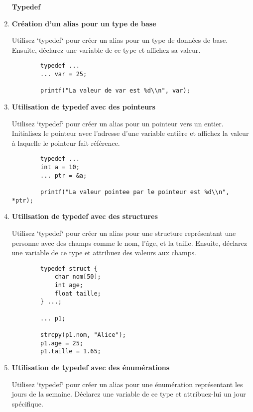 \begin{enumerate}
\textbf{Typedef}

	 \item \textbf{Création d'un alias pour un type de base}
	
	Utilisez `typedef` pour créer un alias pour un type de données de base. Ensuite, déclarez une variable de ce type et affichez sa valeur.
	
	\begin{lstlisting}
		typedef ...
		... var = 25;
		
		printf("La valeur de var est %d\\n", var);
	\end{lstlisting}
	
	\item \textbf{Utilisation de typedef avec des pointeurs}
	
	Utilisez `typedef` pour créer un alias pour un pointeur vers un entier. Initialisez le pointeur avec l'adresse d'une variable entière et affichez la valeur à laquelle le pointeur fait référence.
	
	\begin{lstlisting}
		typedef ...
		int a = 10;
		... ptr = &a;
		
		printf("La valeur pointee par le pointeur est %d\\n", *ptr);
	\end{lstlisting}
	
	\item \textbf{Utilisation de typedef avec des structures}
	
	Utilisez `typedef` pour créer un alias pour une structure représentant une personne avec des champs comme le nom, l'âge, et la taille. Ensuite, déclarez une variable de ce type et attribuez des valeurs aux champs.
	
	\begin{lstlisting}
		typedef struct {
			char nom[50];
			int age;
			float taille;
		} ...;
		
		... p1;
		
		strcpy(p1.nom, "Alice");
		p1.age = 25;
		p1.taille = 1.65;
	\end{lstlisting}
	
	\item \textbf{Utilisation de typedef avec des énumérations}
	
	Utilisez `typedef` pour créer un alias pour une énumération représentant les jours de la semaine. Déclarez une variable de ce type et attribuez-lui un jour spécifique.
	

\end{enumerate}
